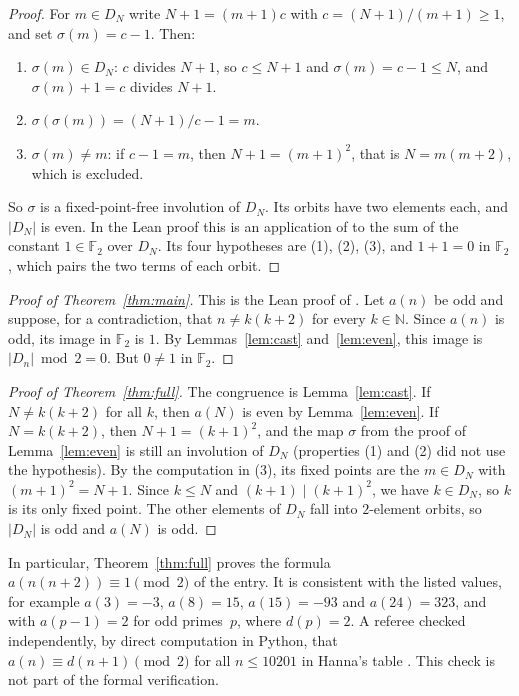 \documentclass[11pt]{amsart}
\theoremstyle{plain}
\theoremstyle{definition}
\newcommand{\N}{\mathbb{N}}
\newcommand{\F}{\mathbb{F}_2}
\begin{document}
\begin{proof}
For $m\in D_N$ write $N+1=(m+1)c$ with $c=(N+1)/(m+1)\ge1$, and set $\sigma(m)=c-1$. Then:
\begin{enumerate}
\item $\sigma(m)\in D_N$: $c$ divides $N+1$, so $c\le N+1$ and $\sigma(m)=c-1\le N$, and $\sigma(m)+1=c$ divides $N+1$.
\item $\sigma(\sigma(m))=(N+1)/c-1=m$.
\item $\sigma(m)\ne m$: if $c-1=m$, then $N+1=(m+1)^2$, that is $N=m(m+2)$, which is excluded.
\end{enumerate}
So $\sigma$ is a fixed-point-free involution of $D_N$. Its orbits have two elements each, and $|D_N|$ is even. In the Lean proof this is an application of  to the sum of the constant $1\in\F$ over $D_N$. Its four hypotheses are (1), (2), (3), and $1+1=0$ in $\F$, which pairs the two terms of each orbit.
\end{proof}

\begin{proof}[Proof of Theorem~\ref{thm:main}]
This is the Lean proof of . Let $a(n)$ be odd and suppose, for a contradiction, that $n\ne k(k+2)$ for every $k\in\N$. Since $a(n)$ is odd, its image in $\F$ is $1$. By Lemmas~\ref{lem:cast} and~\ref{lem:even}, this image is $|D_n|\bmod 2=0$. But $0\ne1$ in $\F$.
\end{proof}

\begin{proof}[Proof of Theorem~\ref{thm:full}]
The congruence is Lemma~\ref{lem:cast}. If $N\ne k(k+2)$ for all $k$, then $a(N)$ is even by Lemma~\ref{lem:even}. If $N=k(k+2)$, then $N+1=(k+1)^2$, and the map $\sigma$ from the proof of Lemma~\ref{lem:even} is still an involution of $D_N$ (properties (1) and (2) did not use the hypothesis). By the computation in (3), its fixed points are the $m\in D_N$ with $(m+1)^2=N+1$. Since $k\le N$ and $(k+1)\mid(k+1)^2$, we have $k\in D_N$, so $k$ is its only fixed point. The other elements of $D_N$ fall into $2$-element orbits, so $|D_N|$ is odd and $a(N)$ is odd.
\end{proof}

In particular, Theorem~\ref{thm:full} proves the formula $a(n(n+2))\equiv1\pmod2$ of the entry. It is consistent with the listed values, for example $a(3)=-3$, $a(8)=15$, $a(15)=-93$ and $a(24)=323$, and with $a(p-1)=2$ for odd primes~$p$, where $d(p)=2$. A referee checked independently, by direct computation in Python, that $a(n)\equiv d(n+1)\pmod 2$ for all $n\le10201$ in Hanna's table \cite{A323695}. This check is not part of the formal verification.
\end{document}
